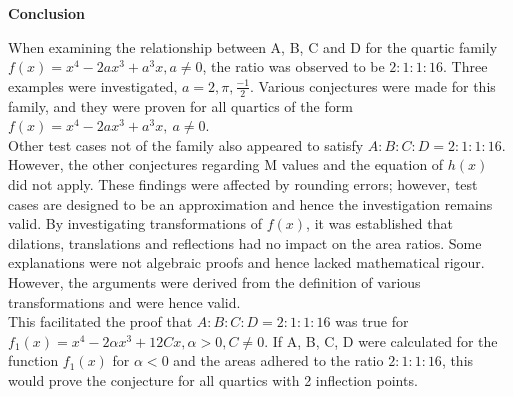 \documentclass{homework}
\begin{document}
\begin{center}
    \textbf{\large{Conclusion}} \vspace{0.3em}\\
\end{center}
    When examining the relationship between A, B, C and D for the quartic family $f(x)=x^4-2ax^3+a^3x, a\neq0$, the ratio was observed to be $2:1:1:16$. Three examples were investigated, $a=2, \pi, \frac{-1}{2}$. 
    Various conjectures were made for this family, and they were proven for all quartics of the form $f(x)=x^4-2a{x}^3+a^3x,\ a\neq0$. \vspace{0.8em} \\
    Other test cases not of the family also appeared to satisfy $A:B:C:D=2:1:1:16$. However, the other conjectures regarding M values and the equation of $h(x)$ did not apply. These findings were affected by rounding errors; however, test cases are designed to be an approximation and hence the investigation remains valid. By investigating transformations of $f(x)$, it was established that dilations, translations and reflections had no impact on the area ratios. Some explanations were not algebraic proofs and hence lacked mathematical rigour. However, the arguments were derived from the definition of various transformations and were hence valid. \vspace{0.8em} \\
    This facilitated the proof that $A:B:C:D=2:1:1:16$ was true for $f_1(x)=x^4-2\alpha x^3+12Cx, \alpha > 0, C\neq 0$. 
    If A, B, C, D were calculated for the function $f_1(x)$ for $\alpha <0 $ and the areas adhered to the ratio $2:1:1:16$, this would prove the conjecture for all quartics with 2 inflection points.\\
\newpage
\end{document}
